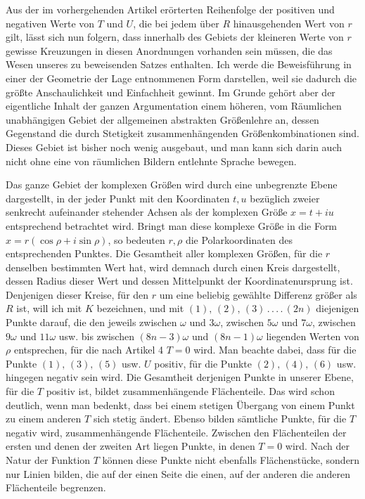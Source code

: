 Aus der im vorhergehenden Artikel erörterten Reihenfolge der positiven und negativen Werte von $T$ und $U$, die bei jedem über $R$ hinausgehenden Wert von $r$ gilt, lässt sich nun folgern, dass innerhalb des Gebiets der kleineren Werte von $r$ gewisse Kreuzungen in diesen Anordnungen vorhanden sein müssen, die das Wesen unseres zu beweisenden Satzes enthalten. Ich werde die Beweisführung in einer der Geometrie der Lage entnommenen Form darstellen, weil sie dadurch die größte Anschaulichkeit und Einfachheit gewinnt. Im Grunde gehört aber der eigentliche Inhalt der ganzen Argumentation einem höheren, vom Räumlichen unabhängigen Gebiet der allgemeinen abstrakten Größenlehre an, dessen Gegenstand die durch Stetigkeit zusammenhängenden Größenkombinationen sind. Dieses Gebiet ist bisher noch wenig ausgebaut, und man kann sich darin auch nicht ohne eine von räumlichen Bildern entlehnte Sprache bewegen.

Das ganze Gebiet der komplexen Größen wird durch eine unbegrenzte Ebene dargestellt, in der jeder Punkt mit den Koordinaten $t,u$ bezüglich zweier senkrecht aufeinander stehender Achsen als der komplexen Größe $x=t+iu$ entsprechend betrachtet wird. Bringt man diese komplexe Größe in die Form $x=r(\cos\rho+i\sin\rho)$, so bedeuten $r,\rho$ die Polarkoordinaten des entsprechenden Punktes. Die Gesamtheit aller komplexen Größen, für die $r$ denselben bestimmten Wert hat, wird demnach durch einen Kreis dargestellt, dessen Radius dieser Wert und dessen Mittelpunkt der Koordinatenursprung ist. Denjenigen dieser Kreise, für den $r$ um eine beliebig gewählte Differenz größer als $R$ ist, will ich mit $K$ bezeichnen, und mit $(1),\,(2),\,(3)\,.\,.\,.\,.\,(2n)$ diejenigen Punkte darauf, die den jeweils zwischen $\omega$ und $3\omega$, zwischen $5\omega$ und $7\omega$, zwischen $9\omega$ und $11\omega$ usw. bis zwischen $(8n-3)\omega$ und $(8n-1)\omega$ liegenden Werten von $\rho$ entsprechen, für die nach Artikel 4 $T=0$ wird. Man beachte dabei, dass für die Punkte $(1),\,(3),\,(5)$ usw. $U$ positiv, für die Punkte $(2),\,(4),\,(6)$ usw. hingegen negativ sein wird.
Die Gesamtheit derjenigen Punkte in unserer Ebene, für die $T$ positiv ist, bildet zusammenhängende Flächenteile. Das wird schon deutlich, wenn man bedenkt, dass bei einem stetigen Übergang von einem Punkt zu einem anderen $T$ sich stetig ändert. Ebenso bilden sämtliche Punkte, für die $T$ negativ wird, zusammenhängende Flächenteile. Zwischen den Flächenteilen der ersten und denen der zweiten Art liegen Punkte, in denen $T=0$ wird. Nach der Natur der Funktion $T$ können diese Punkte nicht ebenfalls Flächenstücke, sondern nur Linien bilden, die auf der einen Seite die einen, auf der anderen die anderen Flächenteile begrenzen.

